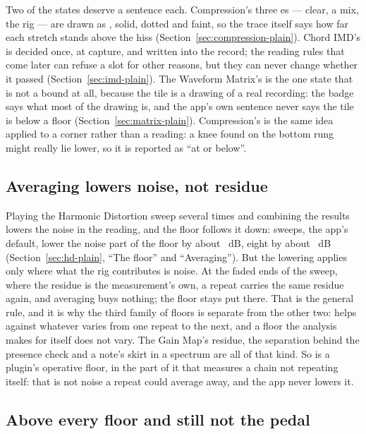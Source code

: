 \documentclass[11pt,a4paper]{article}
\begin{document}
Two of the states deserve a sentence each. Compression's three
es --- clear, a mix, the rig --- are drawn as
, solid, dotted and faint, so the trace itself says how
far each stretch stands above the hiss
(Section~\ref{sec:compression-plain}). Chord IMD's  is decided
once, at capture, and written into the record; the reading rules that
come later can refuse a slot for other reasons, but they can never change
whether it passed (Section~\ref{sec:imd-plain}). The Waveform Matrix's
 is the one state that is not a bound at all, because
the tile is a drawing of a real recording: the badge says what most of
the drawing is, and the app's own sentence never says the tile is below
a floor (Section~\ref{sec:matrix-plain}). Compression's
 is the same idea applied to a corner rather than a
reading: a knee found on the bottom rung might really lie lower, so it is
reported as ``at or below''.

\subsection{Averaging lowers noise, not residue}

Playing the Harmonic Distortion sweep several times and combining the
results lowers the noise in the reading, and the floor follows it down:
\hdDefaultAverages{} sweeps, the app's default, lower the noise part of
the floor by about \hdAveragingFourDB{}~dB, eight by about
\hdAveragingEightDB{}~dB (Section~\ref{sec:hd-plain}, ``The floor'' and
``Averaging''). But the lowering applies only where what the rig
contributes is noise. At the faded ends of the sweep, where the residue is
the measurement's own, a repeat carries the same residue again, and
averaging buys nothing; the floor stays put there. That is the general
rule, and it is why the third family of floors is separate from the other
two:  helps against whatever varies from one repeat to
the next, and a floor the analysis makes for itself does not vary. The
Gain Map's residue, the separation behind the presence check and a
note's skirt in a spectrum are all of that kind. So is a plugin's
operative floor, in the part of it that measures a chain not repeating
itself: that is not noise a repeat could average away, and the app never
lowers it.

\subsection{Above every floor and still not the pedal}
\end{document}
